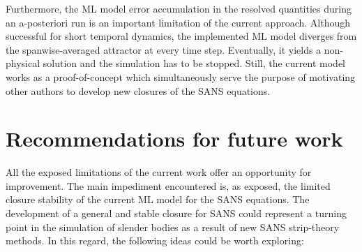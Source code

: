 \documentclass[../main.tex]{subfiles}
\begin{document}
Furthermore, the ML model error accumulation in the resolved quantities during an a-posteriori run is an important limitation of the current approach.
Although successful for short temporal dynamics, the implemented ML model diverges from the spanwise-averaged attractor at every time step.
Eventually, it yields a non-physical solution and the simulation has to be stopped.
Still, the current model works as a proof-of-concept which simultaneously serve the purpose of motivating other authors to develop new closures of the SANS equations.

\section{Recommendations for future work}

All the exposed limitations of the current work offer an opportunity for improvement.
The main impediment encountered is, as exposed, the limited closure stability of the current ML model for the SANS equations.
The development of a general and stable closure for SANS could represent a turning point in the simulation of slender bodies as a result of new SANS strip-theory methods.
In this regard, the following ideas could be worth exploring:
\end{document}
